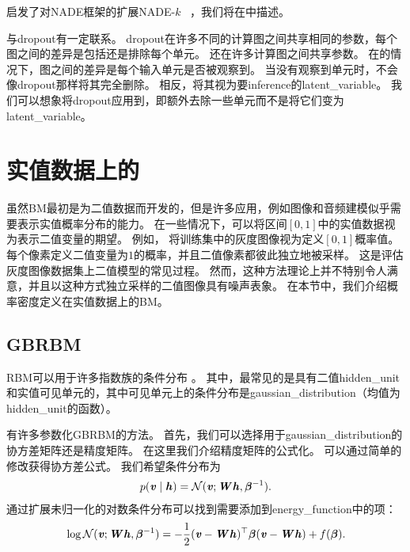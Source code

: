 启发了对NADE框架的扩展NADE-$k$~\citep{Raiko-et-al-2014} ，我们将在中描述。

与\gls{dropout}有一定联系。
\gls{dropout}在许多不同的计算图之间共享相同的参数，每个图之间的差异是包括还是排除每个单元。
还在许多计算图之间共享参数。
在的情况下，图之间的差异是每个输入单元是否被观察到。
当没有观察到单元时，不会像\gls{dropout}那样将其完全删除。
相反，将其视为要\gls{inference}的\gls{latent_variable}。
我们可以想象将\gls{dropout}应用到，即额外去除一些单元而不是将它们变为\gls{latent_variable}。


\section{实值数据上的}
\label{sec:boltzmann_machines_for_real_valued_data}
虽然\gls{BM}最初是为二值数据而开发的，但是许多应用，例如图像和音频建模似乎需要表示实值概率分布的能力。
在一些情况下，可以将区间$[0,1]$中的实值数据视为表示二值变量的期望。
例如， \citet{Hinton-PoE-2000}将训练集中的灰度图像视为定义$[0,1]$概率值。
每个像素定义二值变量为$1$的概率，并且二值像素都彼此独立地被采样。
这是评估灰度图像数据集上二值模型的常见过程。
然而，这种方法理论上并不特别令人满意，并且以这种方式独立采样的二值图像具有噪声表象。
在本节中，我们介绍概率密度定义在实值数据上的\gls{BM}。


\subsection{\gls{GBRBM}}
\label{sec:gaussian_bernoulli_rbms}
\gls{RBM}可以用于许多指数族的条件分布 \citep{Welling05}。
其中，最常见的是具有二值\gls{hidden_unit}和实值可见单元的，其中可见单元上的条件分布是\gls{gaussian_distribution}（均值为\gls{hidden_unit}的函数）。

有许多参数化\gls{GBRBM}的方法。
首先，我们可以选择用于\gls{gaussian_distribution}的协方差矩阵还是精度矩阵。
在这里我们介绍精度矩阵的公式化。
可以通过简单的修改获得协方差公式。
我们希望条件分布为
\begin{align}
 p(\boldsymbol{\mathit{v}}  \mid  \boldsymbol{\mathit{h}}) = \mathcal{N}(\boldsymbol{\mathit{v}}; \boldsymbol{\mathit{W}}\boldsymbol{\mathit{h}}, \boldsymbol{\beta}^{-1}).
\end{align}
通过扩展未归一化的对数条件分布可以找到需要添加到\gls{energy_function}中的项：
\begin{align} \label{eq:2039log}
 \log \mathcal{N}(\boldsymbol{\mathit{v}}; \boldsymbol{\mathit{W}}\boldsymbol{\mathit{h}}, \boldsymbol{\beta}^{-1}) = -\frac{1}{2}(\boldsymbol{\mathit{v}} - \boldsymbol{\mathit{W}}\boldsymbol{\mathit{h}})^\top \boldsymbol{\beta} (\boldsymbol{\mathit{v}} - \boldsymbol{\mathit{W}}\boldsymbol{\mathit{h}}) + 
 f(\boldsymbol{\beta}) .
\end{align}

